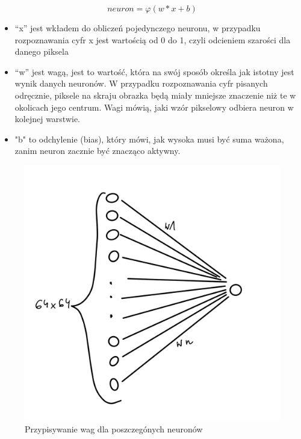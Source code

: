 \documentclass[openright]{xmgr}
\begin{document}
\begin{equation}
neuron  = φ (w * x + b)
\end{equation}

\begin{itemize}
\item “x” jest wkładem do obliczeń pojedynczego neuronu, w przypadku rozpoznawania cyfr x jest wartością od 0 do 1, czyli odcieniem szarości dla danego piksela
\item “w” jest wagą, jest to wartość, która na swój sposób określa jak istotny jest wynik danych neuronów. W przypadku rozpoznawania cyfr pisanych odręcznie, piksele na skraju obrazka będą miały mniejsze znaczenie niż te w okolicach jego centrum. Wagi mówią, jaki wzór pikselowy odbiera neuron w kolejnej warstwie.
\item "b" to odchylenie (bias), który mówi, jak wysoka musi być suma ważona, zanim neuron zacznie być znacząco aktywny.
\end{itemize}

\begin{figure}[!tbh]
\centering
\includegraphics[width=.8\hsize]{fig/3}
\caption{Przypisywanie wag dla poszczegónych neuronów\label{RYS.3}}
\end{figure}
\end{document}
